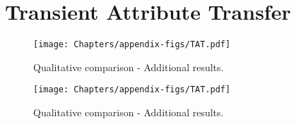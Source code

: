 \chapter{Transient Attribute Transfer}
\label{TAT:add_res}


\begin{figure}[ht]
  \centering
  {\texttt{[image: Chapters/appendix-figs/TAT.pdf]}}

   \caption{Qualitative comparison - Additional results.}
   \label{fig:appendix-tat1}
\end{figure}

\begin{figure}[ht]
  \centering

  {\texttt{[image: Chapters/appendix-figs/TAT.pdf]}}

   \caption{Qualitative comparison - Additional results.}
   \label{fig:appendix-tat2}
\end{figure}

